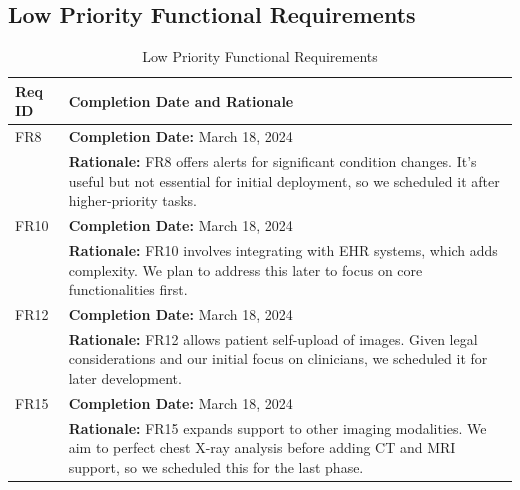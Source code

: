 \documentclass[12pt]{article}
\begin{document}
  \subsection{Low Priority Functional Requirements}
\begin{table}[H]
  \label{TblLowPriorityFRs}
  \begin{tabular}{p{}|p{}}
  \toprule
  \textbf{Req ID} & \textbf{Completion Date and Rationale} \\
  \midrule
  FR8 & \textbf{Completion Date:} March 18, 2024\\
      & \textbf{Rationale:} FR8 offers alerts for significant condition changes. It's useful but not essential for initial deployment, so we scheduled it after higher-priority tasks. \\
  \midrule
  FR10 & \textbf{Completion Date:} March 18, 2024\\
       & \textbf{Rationale:} FR10 involves integrating with EHR systems, which adds complexity. We plan to address this later to focus on core functionalities first. \\
  \midrule
  FR12 & \textbf{Completion Date:} March 18, 2024\\
       & \textbf{Rationale:} FR12 allows patient self-upload of images. Given legal considerations and our initial focus on clinicians, we scheduled it for later development. \\
  \midrule
  FR15 & \textbf{Completion Date:} March 18, 2024\\
       & \textbf{Rationale:} FR15 expands support to other imaging modalities. We aim to perfect chest X-ray analysis before adding CT and MRI support, so we scheduled this for the last phase. \\
  \bottomrule
  \end{tabular}
  \caption{Low Priority Functional Requirements}
  \end{table}
  
\end{document}
